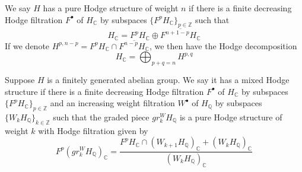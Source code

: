 \begin{definition}
We say $H$ has a pure Hodge structure of weight $n$ if there is a finite decreasing Hodge filtration $F^\bullet$ of $H_{\mathbb C}$ by subspaces $\{F^pH_{\mathbb C}\}_{p\in\mathbb Z}$ such that
\[
H_{\mathbb C}=F^pH_{\mathbb C}\oplus\overline{F^{n+1-p}H_{\mathbb C}}
\]
If we denote $H^{p,n-p}=F^pH_{\mathbb C}\cap \overline{F^{n-p}H_{\mathbb C}}$, we then have the Hodge decomposition
\[
H_{\mathbb C}=\bigoplus_{p+q=n}H^{p,q}
\]
\end{definition}

\begin{definition}
Suppose $H$ is a finitely generated abelian group. We say it has a mixed Hodge structure if there is a finite decreasing Hodge filtration $F^\bullet$ of $H_{\mathbb C}$ by subspaces $\{F^pH_{\mathbb C}\}_{p\in\mathbb Z}$ and an increasing weight filtration $W^\bullet$ of $H_{\mathbb Q}$ by subspaces $\{W_kH_{\mathbb Q}\}_{k\in\mathbb Z}$ such that the graded piece $gr^W_kH_{\mathbb Q}$ is a pure Hodge structure of weight $k$ with Hodge filtration given by
\[
F^p(gr^W_kH_{\mathbb Q})_{\mathbb C}=\frac{F^pH_{\mathbb C}\cap (W_{k+1}H_{\mathbb Q})_{\mathbb C}+(W_kH_{\mathbb Q})_{\mathbb C}}{(W_kH_{\mathbb Q})_{\mathbb C}}
\]
\end{definition}



